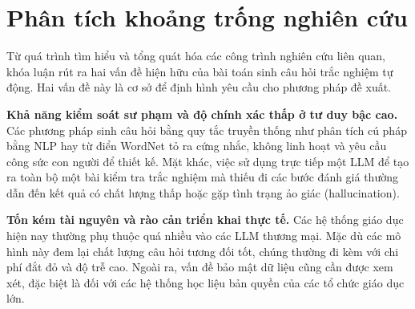 \section{Phân tích khoảng trống nghiên cứu}

Từ quá trình tìm hiểu và tổng quát hóa các công trình nghiên cứu liên quan, khóa luận rút ra hai vấn đề hiện hữu của bài toán sinh câu hỏi trắc nghiệm tự động. Hai vấn đề này là cơ sở để định hình yêu cầu cho phương pháp đề xuất.

\textbf{Khả năng kiểm soát sư phạm và độ chính xác thấp ở tư duy bậc cao.} Các phương pháp sinh câu hỏi bằng quy tắc truyền thống như phân tích cú pháp bằng NLP hay từ điển WordNet tỏ ra cứng nhắc, không linh hoạt và yêu cầu công sức con người để thiết kế. Mặt khác, việc sử dụng trực tiếp một LLM để tạo ra toàn bộ một bài kiểm tra trắc nghiệm mà thiếu đi các bước đánh giá thường dẫn đến kết quả có chất lượng thấp hoặc gặp tình trạng ảo giác (hallucination).

\textbf{Tốn kém tài nguyên và rào cản triển khai thực tế.} Các hệ thống giáo dục hiện nay thường phụ thuộc quá nhiều vào các LLM thương mại. Mặc dù các mô hình này đem lại chất lượng câu hỏi tương đối tốt, chúng thường đi kèm với chi phí đắt đỏ và độ trễ cao. Ngoài ra, vấn đề bảo mật dữ liệu cũng cần được xem xét, đặc biệt là đối với các hệ thống học liệu bản quyền của các tổ chức giáo dục lớn.
